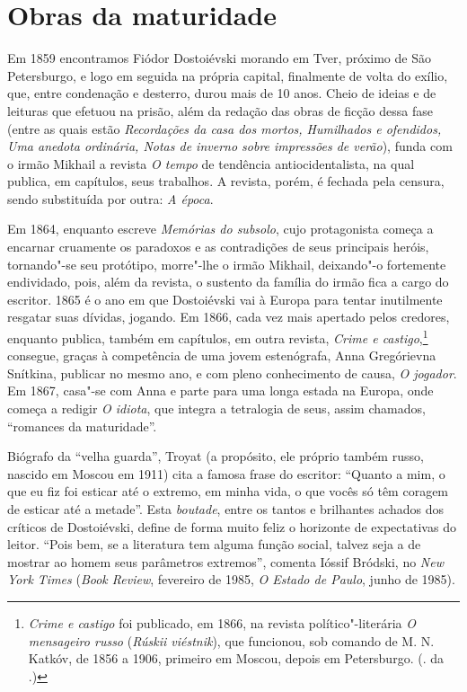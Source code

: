 \section{\uppercase{O}bras da maturidade}


Em 1859 encontramos Fiódor Dostoiévski morando em Tver, próximo
de São Petersburgo, e logo em seguida na própria capital,
finalmente de volta do exílio, que, entre condenação e desterro,
durou mais de 10 anos. Cheio de ideias e de leituras que efetuou
na prisão, além da redação das obras de ficção dessa fase (entre
as quais estão \emph{Recordações da casa dos mortos, Humilhados
e ofendidos, Uma anedota ordinária, Notas de inverno sobre
impressões de verão}), funda com o irmão Mikhail a revista
\emph{O tempo} de tendência antiocidentalista, na qual publica,
em capítulos, seus trabalhos. A revista, porém, é fechada pela
censura, sendo substituída por outra: \emph{A época}.

Em 1864, enquanto escreve \emph{Memórias do subsolo}, cujo
protagonista começa a encarnar cruamente os paradoxos e as
contradições de seus principais heróis, tornando"-se seu
protótipo, morre"-lhe o irmão Mikhail, deixando"-o fortemente
endividado, pois, além da revista, o sustento da família do
irmão fica a cargo do escritor. 1865 é o ano em que Dostoiévski
vai à Europa para tentar inutilmente resgatar suas dívidas,
jogando. Em 1866, cada vez mais apertado pelos credores, enquanto
publica, também em capítulos, em outra revista, \emph{Crime e
castigo},\footnote{\emph{Crime e castigo} foi publicado, em 1866,
na revista político"-literária \emph{O mensageiro russo}
(\emph{Rúskii viéstnik}), que funcionou, sob comando de M. N.
Katkóv, de 1856 a 1906, primeiro em Moscou, depois em Petersburgo.
(. da .)} consegue, graças à competência de uma jovem
estenógrafa, Anna Gregórievna Snítkina, publicar no mesmo ano,
e com pleno conhecimento de causa, \emph{O jogador}. Em 1867,
casa"-se com Anna e parte para uma longa estada na Europa, onde
começa a redigir \emph{O idiota}, que integra a
tetralogia de seus, assim chamados, ``romances da maturidade''.

Biógrafo da ``velha guarda'', Troyat (a propósito, ele próprio
também russo, nascido em Moscou em 1911) cita a famosa frase
do escritor: ``Quanto a mim, o que eu fiz foi esticar até o
extremo, em minha vida, o que vocês só têm coragem de esticar até
a metade''. Esta \emph{boutade}, entre os tantos e brilhantes achados
dos críticos de Dostoiévski, define de forma muito feliz o
horizonte de expectativas do leitor. ``Pois bem, se a
literatura tem alguma função social, talvez seja a de mostrar
ao homem seus parâmetros extremos'', comenta Ióssif Bródski,
no \emph{New York Times} (\emph{Book Review}, fevereiro de 1985, \emph{O Estado de Paulo}, junho de 1985).


